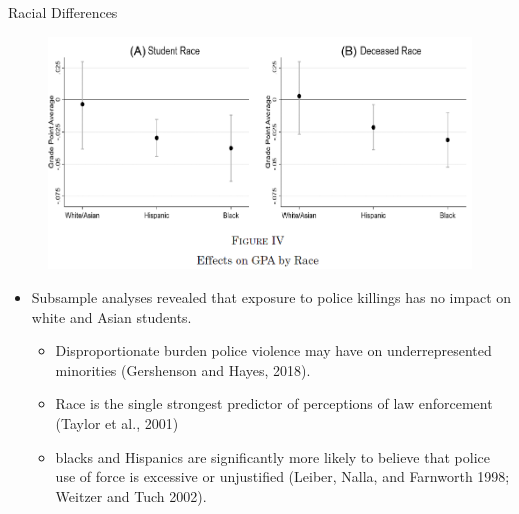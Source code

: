 \documentclass[dvipdfmx]{beamer}
\begin{document}
\begin{frame}{Racial Differences}
  \begin{figure}
    \centering
    \includegraphics[scale = .55]{fig_tab/os20220113/F4}
  \end{figure}
\end{frame}

\begin{frame}{}
  \begin{itemize}
    \item Subsample analyses revealed that exposure to police killings has no impact on white and Asian students.
    \begin{itemize}
      \item Disproportionate burden police violence may have on underrepresented minorities (Gershenson and Hayes, 2018).
      \item Race is the single strongest predictor of perceptions of law enforcement (Taylor et al., 2001)
      \item blacks and Hispanics are significantly more likely to believe that police use of force is excessive or unjustified (Leiber, Nalla, and Farnworth 1998; Weitzer and Tuch 2002).
    \end{itemize}
  \end{itemize}
\end{frame}
\end{document}
